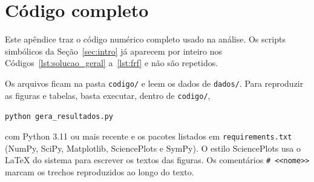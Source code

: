 \clearpage
\appendix
\section{Código completo}
\label{ap:codigo}

Este apêndice traz o código numérico completo usado na análise. Os scripts simbólicos
da Seção~\ref{sec:intro} já aparecem por inteiro nos
Códigos~\ref{lst:solucao_geral} a~\ref{lst:frf} e não são repetidos.

Os arquivos ficam na pasta \texttt{codigo/} e leem os dados de \texttt{dados/}. Para
reproduzir as figuras e tabelas, basta executar, dentro de \texttt{codigo/},
\begin{center}
    \texttt{python gera\_resultados.py}
\end{center}
com Python 3.11 ou mais recente e os pacotes listados em \texttt{requirements.txt}
(NumPy, SciPy, Matplotlib, SciencePlots e SymPy). O estilo SciencePlots usa o
\LaTeX{} do sistema para escrever os textos das figuras. Os comentários
\texttt{\# <{}<nome>{}>} marcam os trechos reproduzidos ao longo do texto.












